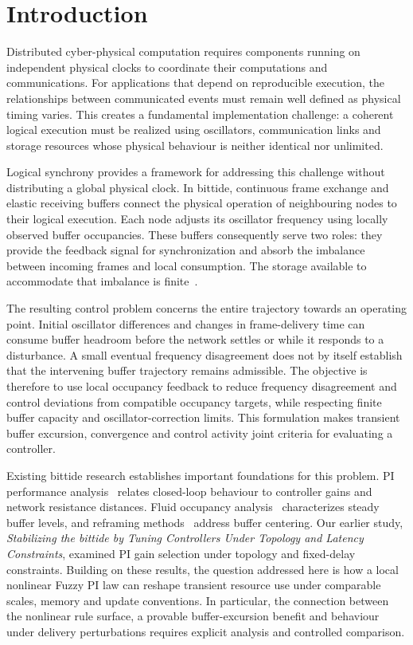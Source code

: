 \section{Introduction}
\label{sec:introduction}

Distributed cyber-physical computation requires components running on independent physical clocks to coordinate their computations and communications. For applications that depend on reproducible execution, the relationships between communicated events must remain well defined as physical timing varies. This creates a fundamental implementation challenge: a coherent logical execution must be realized using oscillators, communication links and storage resources whose physical behaviour is neither identical nor unlimited.

Logical synchrony provides a framework for addressing this challenge without distributing a global physical clock. In bittide, continuous frame exchange and elastic receiving buffers connect the physical operation of neighbouring nodes to their logical execution. Each node adjusts its oscillator frequency using locally observed buffer occupancies. These buffers consequently serve two roles: they provide the feedback signal for synchronization and absorb the imbalance between incoming frames and local consumption. The storage available to accommodate that imbalance is finite~\cite{lall2024logicalSynchrony}.

The resulting control problem concerns the entire trajectory towards an operating point. Initial oscillator differences and changes in frame-delivery time can consume buffer headroom before the network settles or while it responds to a disturbance. A small eventual frequency disagreement does not by itself establish that the intervening buffer trajectory remains admissible. The objective is therefore to use local occupancy feedback to reduce frequency disagreement and control deviations from compatible occupancy targets, while respecting finite buffer capacity and oscillator-correction limits. This formulation makes transient buffer excursion, convergence and control activity joint criteria for evaluating a controller.

Existing bittide research establishes important foundations for this problem. PI performance analysis~\cite{lall2022resistance} relates closed-loop behaviour to controller gains and network resistance distances. Fluid occupancy analysis~\cite{lall2024bufferOccupancy} characterizes steady buffer levels, and reframing methods~\cite{lall2023bufferCentering} address buffer centering. Our earlier study, \emph{Stabilizing the bittide by Tuning Controllers Under Topology and Latency Constraints}, examined PI gain selection under topology and fixed-delay constraints. Building on these results, the question addressed here is how a local nonlinear Fuzzy PI law can reshape transient resource use under comparable scales, memory and update conventions. In particular, the connection between the nonlinear rule surface, a provable buffer-excursion benefit and behaviour under delivery perturbations requires explicit analysis and controlled comparison.


